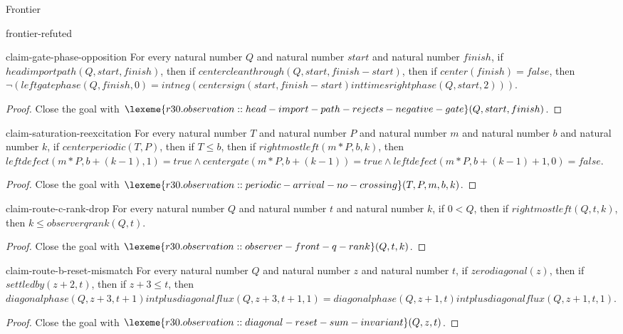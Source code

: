 \begin{lexlean}{Frontier}
\begin{section}{frontier-refuted}
\begin{theorem}{claim-gate-phase-opposition}
For every natural number \(Q\) and natural number \(start\) and natural number \(finish\), if \(headimportpath(Q, start, finish)\), then if \(centercleanthrough(Q, start, finish - start)\), then if \(center(finish) = false\), then \(¬ (leftgatephase(Q, finish, 0) = intneg (centersign(start, finish - start) inttimes rightphase(Q, start, 2)))\).
\begin{proof}
Close the goal with \(\lexeme{r30.observation::head-import-path-rejects-negative-gate}(Q, start, finish)\).
\end{proof}
\end{theorem}

\begin{theorem}{claim-saturation-reexcitation}
For every natural number \(T\) and natural number \(P\) and natural number \(m\) and natural number \(b\) and natural number \(k\), if \(centerperiodic(T, P)\), then if \(T ≤ b\), then if \(rightmostleft(m * P, b, k)\), then \(leftdefect(m * P, b + (k - 1), 1) = true ∧ centergate(m * P, b + (k - 1)) = true ∧ leftdefect(m * P, b + (k - 1) + 1, 0) = false\).
\begin{proof}
Close the goal with \(\lexeme{r30.observation::periodic-arrival-no-crossing}(T, P, m, b, k)\).
\end{proof}
\end{theorem}

\begin{theorem}{claim-route-c-rank-drop}
For every natural number \(Q\) and natural number \(t\) and natural number \(k\), if \(0 < Q\), then if \(rightmostleft(Q, t, k)\), then \(k ≤ observerqrank(Q, t)\).
\begin{proof}
Close the goal with \(\lexeme{r30.observation::observer-front-q-rank}(Q, t, k)\).
\end{proof}
\end{theorem}

\begin{theorem}{claim-route-b-reset-mismatch}
For every natural number \(Q\) and natural number \(z\) and natural number \(t\), if \(zerodiagonal(z)\), then if \(settledby(z + 2, t)\), then if \(z + 3 ≤ t\), then \(diagonalphase(Q, z + 3, t + 1) intplus diagonalflux(Q, z + 3, t + 1, 1) = diagonalphase(Q, z + 1, t) intplus diagonalflux(Q, z + 1, t, 1)\).
\begin{proof}
Close the goal with \(\lexeme{r30.observation::diagonal-reset-sum-invariant}(Q, z, t)\).
\end{proof}
\end{theorem}


\end{section}
\end{lexlean}
